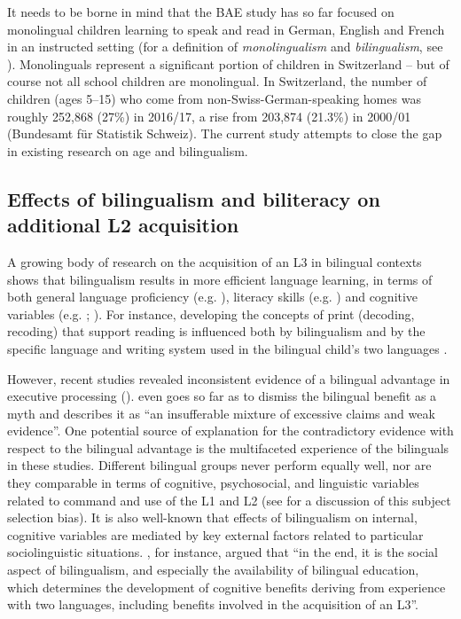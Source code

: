 \documentclass[output=paper,modfonts,nonflat,newtxmath]{langsci/langscibook}
\begin{document}
It needs to be borne in mind that the BAE study has so far focused on monolingual children learning to speak and read in German, English and French in an instructed setting (for a definition of \textit{monolingualism} and \textit{bilingualism}, see ). Monolinguals represent a significant portion of children in Switzerland – but of course not all school children are monolingual. In Switzerland, the number of children (ages 5–15) who come from non-Swiss-German-speaking homes was roughly 252,868 (27\%) in 2016/17, a rise from 203,874 (21.3\%) in 2000/01 (Bundesamt für Statistik Schweiz). The current study attempts to close the gap in existing research on age and bilingualism.

\subsection{{Effects} {of} {bilingualism} {and} {biliteracy} {on} {additional} {L2} {acquisition}}
\label{sec:pfenninger:2.2.}

A growing body of research on the acquisition of an L3 in bilingual contexts shows that bilingualism results in more efficient language learning, in terms of both general language proficiency (e.g. \citealt{Lasagabaster2000, Muñoz2000}), literacy skills (e.g. \citealt{KovelmanEtAl2008}) and cognitive variables (e.g. \citealt{Bialystok2007}; \citealt{AdesopeEtAl2010}). For instance, developing the concepts of print (decoding, recoding) that support reading is influenced both by bilingualism and by the specific language and writing system used in the bilingual child’s two languages \citep{BialystokEtAl2005a, KovelmanEtAl2008}.

However, recent studies revealed inconsistent evidence of a bilingual advantage in executive processing (\citealt{PaapGreenberg2013, deBruinEtAl2014, YowLi2015}). \citet[929]{Morton2014} even goes so far as to dismiss the bilingual benefit as a myth and describes it as “an insufferable mixture of excessive claims and weak evidence”. One potential source of explanation for the contradictory evidence with respect to the bilingual advantage is the multifaceted experience of the bilinguals in these studies. Different bilingual groups never perform equally well, nor are they comparable in terms of cognitive, psychosocial, and linguistic variables related to command and use of the L1 and L2 (see \citealt{DeAngelis2015} for a discussion of this subject selection bias). It is also well-known that effects of bilingualism on internal, cognitive variables are mediated by key external factors related to particular sociolinguistic situations. \citet[225]{Sanz2008}, for instance, argued that “in the end, it is the social aspect of bilingualism, and especially the availability of bilingual education, which determines the development of cognitive benefits deriving from experience with two languages, including benefits involved in the acquisition of an L3”.
\end{document}
